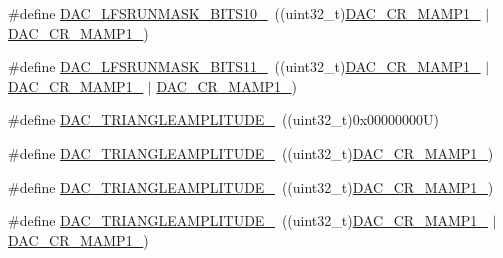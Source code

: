 \begin{DoxyCompactItemize}
\item 
\#define \mbox{\hyperlink{group___d_a_c_ex__lfsrunmask__triangleamplitude_gac795f6628d7f47337f7c8361b4c39309}{D\+A\+C\+\_\+\+L\+F\+S\+R\+U\+N\+M\+A\+S\+K\+\_\+\+B\+I\+T\+S10\+\_}}~((uint32\+\_\+t)\mbox{\hyperlink{group___peripheral___registers___bits___definition_gafdc83b4feb742c632ba66f55d102432b}{D\+A\+C\+\_\+\+C\+R\+\_\+\+M\+A\+M\+P1\+\_}} $\vert$ \mbox{\hyperlink{group___peripheral___registers___bits___definition_ga6cc15817842cb7992d449c448684f68d}{D\+A\+C\+\_\+\+C\+R\+\_\+\+M\+A\+M\+P1\+\_}})
\item 
\#define \mbox{\hyperlink{group___d_a_c_ex__lfsrunmask__triangleamplitude_ga91b57e42ac27ef9cae7c728d4124e75b}{D\+A\+C\+\_\+\+L\+F\+S\+R\+U\+N\+M\+A\+S\+K\+\_\+\+B\+I\+T\+S11\+\_}}~((uint32\+\_\+t)\mbox{\hyperlink{group___peripheral___registers___bits___definition_gafdc83b4feb742c632ba66f55d102432b}{D\+A\+C\+\_\+\+C\+R\+\_\+\+M\+A\+M\+P1\+\_}} $\vert$ \mbox{\hyperlink{group___peripheral___registers___bits___definition_ga6cc15817842cb7992d449c448684f68d}{D\+A\+C\+\_\+\+C\+R\+\_\+\+M\+A\+M\+P1\+\_}} $\vert$ \mbox{\hyperlink{group___peripheral___registers___bits___definition_ga4225dcce22b440fcd3a8ad96c5f2baec}{D\+A\+C\+\_\+\+C\+R\+\_\+\+M\+A\+M\+P1\+\_}})
\item 
\#define \mbox{\hyperlink{group___d_a_c_ex__lfsrunmask__triangleamplitude_ga3d049906f04fabaf9508c7172d2c125d}{D\+A\+C\+\_\+\+T\+R\+I\+A\+N\+G\+L\+E\+A\+M\+P\+L\+I\+T\+U\+D\+E\+\_}}~((uint32\+\_\+t)0x00000000\+U)
\item 
\#define \mbox{\hyperlink{group___d_a_c_ex__lfsrunmask__triangleamplitude_gaa334aae5c5295ac13a5f4c0c93a95eac}{D\+A\+C\+\_\+\+T\+R\+I\+A\+N\+G\+L\+E\+A\+M\+P\+L\+I\+T\+U\+D\+E\+\_}}~((uint32\+\_\+t)\mbox{\hyperlink{group___peripheral___registers___bits___definition_ga4225dcce22b440fcd3a8ad96c5f2baec}{D\+A\+C\+\_\+\+C\+R\+\_\+\+M\+A\+M\+P1\+\_}})
\item 
\#define \mbox{\hyperlink{group___d_a_c_ex__lfsrunmask__triangleamplitude_ga27c799055d0d9ddc50b73223ab5563d2}{D\+A\+C\+\_\+\+T\+R\+I\+A\+N\+G\+L\+E\+A\+M\+P\+L\+I\+T\+U\+D\+E\+\_}}~((uint32\+\_\+t)\mbox{\hyperlink{group___peripheral___registers___bits___definition_ga6cc15817842cb7992d449c448684f68d}{D\+A\+C\+\_\+\+C\+R\+\_\+\+M\+A\+M\+P1\+\_}})
\item 
\#define \mbox{\hyperlink{group___d_a_c_ex__lfsrunmask__triangleamplitude_ga1edcf3cccdfcb11c0ca32d8f18abdffd}{D\+A\+C\+\_\+\+T\+R\+I\+A\+N\+G\+L\+E\+A\+M\+P\+L\+I\+T\+U\+D\+E\+\_}}~((uint32\+\_\+t)\mbox{\hyperlink{group___peripheral___registers___bits___definition_ga6cc15817842cb7992d449c448684f68d}{D\+A\+C\+\_\+\+C\+R\+\_\+\+M\+A\+M\+P1\+\_}} $\vert$ \mbox{\hyperlink{group___peripheral___registers___bits___definition_ga4225dcce22b440fcd3a8ad96c5f2baec}{D\+A\+C\+\_\+\+C\+R\+\_\+\+M\+A\+M\+P1\+\_}})

\end{DoxyCompactItemize}
